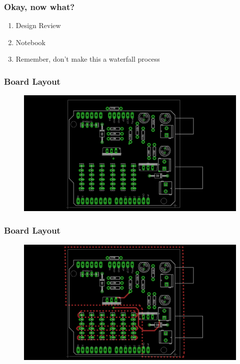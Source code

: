 \documentclass{beamer}
\begin{document}

\begin{frame}
\frametitle{Okay, now what?}
\begin{enumerate}
\item Design Review
\item Notebook
\item Remember, don't make this a waterfall process
\end{enumerate}
\end{frame}


\begin{frame}
\frametitle{Board Layout}
\begin{figure}
\includegraphics[width=1\linewidth]{boardnone.png}
\end{figure}
\end{frame}


\begin{frame}
\frametitle{Board Layout}
\begin{figure}
\includegraphics[width=1\linewidth]{boardtop.png}
\end{figure}
\end{frame}
\end{document}

